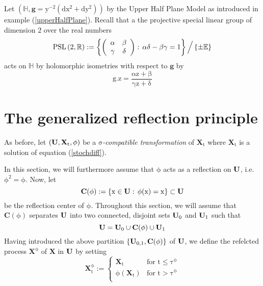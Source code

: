 \documentclass[10 pt,english]{smfart}
\newcommand{\Xt}{\mathrm{\mathbf{X}}_{t}}
\newcommand{\X}{\mathrm{\mathbf{X}}}
\newcommand{\C}{\mathrm{\mathbf{C}}}
\newcommand{\g}{\mathrm{\mathbf{g}}}
\newcommand{\U}{{\bf{U}}}
\begin{document}
\begin{exem}\label{upperHalfPlanePeriodic} Let $\mathrm{\left(\mathbb{H}, \g=y^{-2}\left(dx^2+dy^2\right)\right)}$ by the Upper Half Plane Model as introduced in example (\ref{upperHalfPlane}). Recall that a the projective special linear group of dimension $\mathrm{2}$ over the real numbers
\begin{equation}
\mathrm{PSL\left(2,\mathbb{R}\right):=\left\{\left( \begin{array}{ccc}
\alpha & \beta  \\                                           
 \gamma & \delta \\                                              
\end{array}\right):\,\alpha\delta-\beta\gamma=1\right\}\Big\slash\left\{\pm \mathbb{E}\right\}}
\end{equation} acts on $\mathbb{H}$ by holomorphic isometries with respect to $\mathrm{\g}$ by 
\begin{equation}
\mathrm{g.z=\frac{\alpha z + \beta}{\gamma z +\delta}}
\end{equation} 

\end{exem}

\section{The generalized reflection principle}
As before, let $\mathrm{(\U,\Xt,\phi)}$ be a $\mathrm{\sigma}$\textit{-compatible transformation} of $\mathrm{\Xt}$ where $\mathrm{\Xt}$ is a solution of equation (\ref{stochdiff}).

In this section, we will furthermore assume that $\mathrm{\phi}$ acts as a reflection on $\mathrm{\U}$, i.e. $\mathrm{\phi^{2}=\phi}$. Now, let 
\begin{equation}
\mathrm{\C({\phi}) :=\left\{x\in\U:\, \phi(x)=x\right\}\subset \U}
\end{equation} be the reflection center of $\mathrm{\phi}$. Throughout this section, we will assume that $\mathrm{\C({\phi})}$ separates $\mathrm{\U}$ into two connected, disjoint sets $\mathrm{\U_{0}}$ and $\mathrm{\U_{1}}$ such that 
\begin{equation}
\mathrm{\U= \U_{0}\cup \C({\phi}) \cup \U_{1}}
\end{equation}
Having introduced the above partition $\mathrm{\left\{\U_{0,1}, \C({\phi})\right\}}$ of $\mathrm{\U}$, we define the refelcted process $\mathrm{\X^{\phi}}$ of $\mathrm{\X}$ in $\mathrm{\U}$ by setting
$$\mathrm{\X^{\phi}_t:=\left\{ \begin{array}{ll} \mathrm{\X_{t}} &\textrm{for }\mathrm{t\leq \tau^{\phi}}\\  \mathrm{\phi\left(\X_{t}\right)}&\textrm{for }\mathrm{t>\tau^{\phi}}\\ \end{array} \right.}$$
\end{document}
